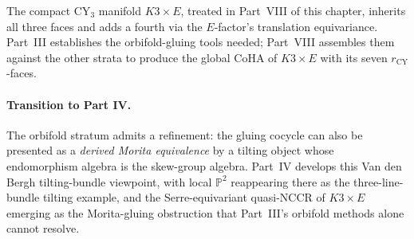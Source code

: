 The compact CY$_3$ manifold $K3 \times E$, treated in Part~VIII of this chapter, inherits all three faces and adds a fourth via the $E$-factor's translation equivariance. Part~III establishes the orbifold-gluing tools needed; Part~VIII assembles them against the other strata to produce the global CoHA of $K3 \times E$ with its seven $r_{\mathrm{CY}}$-faces.

\paragraph*{Transition to Part IV.}
The orbifold stratum admits a refinement: the gluing cocycle can also be presented as a \emph{derived Morita equivalence} by a tilting object whose endomorphism algebra is the skew-group algebra. Part~IV develops this Van den Bergh tilting-bundle viewpoint, with local $\mathbb{P}^2$ reappearing there as the three-line-bundle tilting example, and the Serre-equivariant quasi-NCCR of $K3 \times E$ emerging as the Morita-gluing obstruction that Part~III's orbifold methods alone cannot resolve.
